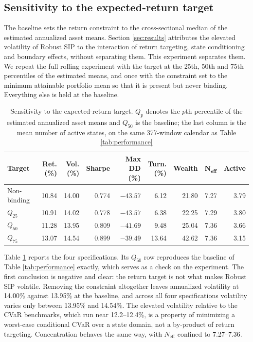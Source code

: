 \documentclass[smallcondensed]{svjour3}
\begin{document}
\subsection{Sensitivity to the expected-return target}\label{sec:target}
The baseline sets the return constraint to the cross-sectional median of the estimated annualized asset means. Section \ref{sec:results} attributes the elevated volatility of Robust SIP to the interaction of return targeting, state conditioning and boundary effects, without separating them. This experiment separates them. We repeat the full rolling experiment with the target at the 25th, 50th and 75th percentiles of the estimated means, and once with the constraint set to the minimum attainable portfolio mean so that it is present but never binding. Everything else is held at the baseline.

\begin{table}[!htbp]
\centering
\caption{Sensitivity to the expected-return target. $Q_p$ denotes the $p$th percentile of the estimated annualized asset means and $Q_{50}$ is the baseline; the last column is the mean number of active states, on the same 377-window calendar as Table \ref{tab:performance}}
\label{tab:target}
\footnotesize
\begin{adjustbox}{max width=\textwidth}
\begin{tabular}{lrrrrrrrr}
\toprule
\textbf{Target} & \makecell[r]{\textbf{Ret.}\\\textbf{(\%)}} & \makecell[r]{\textbf{Vol.}\\\textbf{(\%)}} & \textbf{Sharpe} & \makecell[r]{\textbf{Max DD}\\\textbf{(\%)}} & \makecell[r]{\textbf{Turn.}\\\textbf{(\%)}} & \textbf{Wealth} & $\boldsymbol{N_{\text{eff}}}$ & \textbf{Active} \\
\midrule
Non-binding & 10.84 & 14.00 & 0.774 & $-43.57$ & 6.12 & 21.80 & 7.27 & 3.79 \\
$Q_{25}$ & 10.91 & 14.02 & 0.778 & $-43.57$ & 6.38 & 22.25 & 7.29 & 3.80 \\
$Q_{50}$ & 11.28 & 13.95 & 0.809 & $-41.69$ & 9.48 & 25.04 & 7.36 & 3.66 \\
$Q_{75}$ & 13.07 & 14.54 & 0.899 & $-39.49$ & 13.64 & 42.62 & 7.36 & 3.15 \\
\bottomrule
\end{tabular}
\end{adjustbox}
\end{table}

Table \ref{tab:target} reports the four specifications. Its $Q_{50}$ row reproduces the baseline of Table \ref{tab:performance} exactly, which serves as a check on the experiment. The first conclusion is negative and clear: the return target is not what makes Robust SIP volatile. Removing the constraint altogether leaves annualized volatility at 14.00\% against 13.95\% at the baseline, and across all four specifications volatility varies only between 13.95\% and 14.54\%. The elevated volatility relative to the CVaR benchmarks, which run near 12.2--12.4\%, is a property of minimizing a worst-case conditional CVaR over a state domain, not a by-product of return targeting. Concentration behaves the same way, with $N_{\text{eff}}$ confined to 7.27--7.36.
\end{document}
